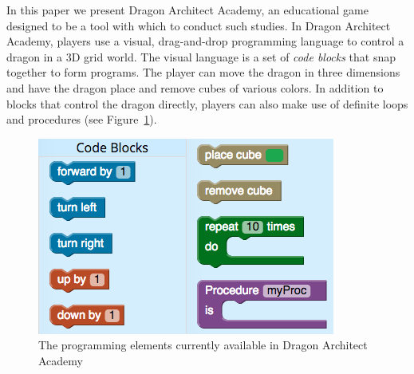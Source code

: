 \documentclass{sig-alternate}
\newcommand{\TODO}[1]{{\color{red} TODO: #1}}
\newcommand{\gametitle}{{\color{RoyalPurple} Dragon Architect Academy}}
\begin{document}

In this paper we present \gametitle{}, an educational game designed to be a tool with which to conduct such studies. 
In \gametitle{}, players use a visual, drag-and-drop programming language to control a dragon in a 3D grid world. 
The visual language is a set of \emph{code blocks} that snap together to form programs. 
The player can move the dragon in three dimensions and have the dragon place and remove cubes of various colors. 
In addition to blocks that control the dragon directly, players can also make use of definite loops and procedures (see Figure~\ref{fig:toolbox}).

\begin{figure}[ht]
  \centering
  \includegraphics[width=\columnwidth]{images/toolbox_wide}
  \caption{The programming elements currently available in \gametitle{}}
  \label{fig:toolbox}
\end{figure}
\end{document}
